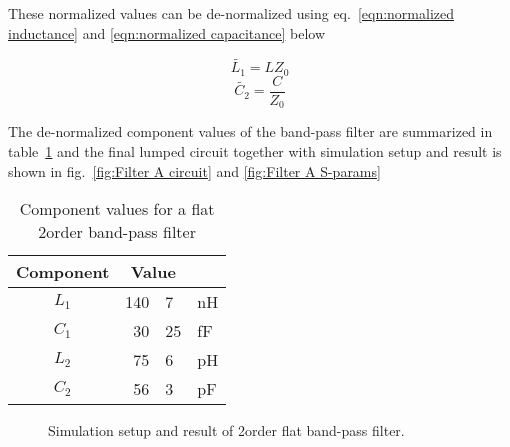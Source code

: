 \documentclass[report.tex]{subfiles}
\begin{document}
These normalized values can be de-normalized using eq.~\ref{eqn:normalized inductance} and \ref{eqn:normalized capacitance} below

\begin{equation}
    \label{eqn:normalized inductance}
    \tilde{L_1}=L Z_0
\end{equation}
\begin{equation}
    \label{eqn:normalized capacitance}
    \tilde{C_2}=\frac{C}{Z_0}
\end{equation}

The de-normalized component values of the band-pass filter are summarized in table~\ref{table:filter values} and the final lumped circuit together with simulation setup and result is shown in fig.~\ref{fig:Filter A circuit} and \ref{fig:Filter A S-params}

\begin{table}[h]
    \centering
    \caption{Component values for a flat 2\nd order band-pass filter}
    \begin{tabular}{c | r @{.} l @{} l}
        Component & \multicolumn{2}{c}{Value} \\
        \hline
        $L_1$     & 140&7 & nH\\
        $C_1$     & 30&25 & fF\\
        $L_2$     & 75&6  & pH\\
        $C_2$     & 56&3  & pF\\
    \end{tabular}
    \label{table:filter values}
\end{table}

\clearpage
\begin{figure}[h]
    \centering
    
    \caption{Simulation setup and result of 2\nd order flat band-pass filter.}
\end{figure}
	\label{fig:Filter A setup}
\clearpage
\end{document}
